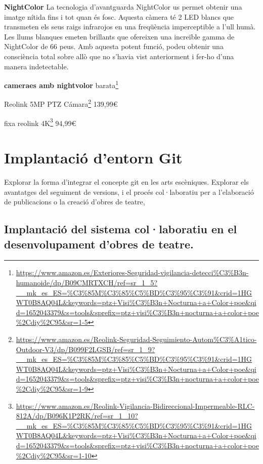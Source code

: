 \documentclass[
  10pt,
]{krantz}
\DeclareRobustCommand{\href}[2]{#2\footnote{\url{#1}}}
\begin{document}
\textbf{NightColor} La tecnologia d'avantguarda NightColor us permet obtenir una imatge nítida fins i tot quan és fosc. Aquesta càmera té 2 LED blancs que transmeten els seus raigs infrarojos en una freqüència imperceptible a l'ull humà. Les llums blanques emeten brillants que ofereixen una increïble gamma de NightColor de 66 peus. Amb aquesta potent funció, podeu obtenir una consciència total sobre allò que no s'havia vist anteriorment i fer-ho d'una manera indetectable.

\textbf{cameraes amb nightvolor} \href{https://www.amazon.es/Exteriores-Seguridad-vigilancia-detecci\%C3\%B3n-humanoide/dp/B09CMRTXCH/ref=sr_1_5?__mk_es_ES=\%C3\%85M\%C3\%85\%C5\%BD\%C3\%95\%C3\%91\&crid=1HGWT0B8AQ04L\&keywords=ptz+Visi\%C3\%B3n+Nocturna+a+Color+poe\&qid=1652043379\&s=tools\&sprefix=ptz+visi\%C3\%B3n+nocturna+a+color+poe\%2Cdiy\%2C95\&sr=1-5}{barata}

\href{https://www.amazon.es/Reolink-Seguridad-Seguimiento-Autom\%C3\%A1tico-Outdoor-V3/dp/B099F2LGSB/ref=sr_1_9?__mk_es_ES=\%C3\%85M\%C3\%85\%C5\%BD\%C3\%95\%C3\%91\&crid=1HGWT0B8AQ04L\&keywords=ptz+Visi\%C3\%B3n+Nocturna+a+Color+poe\&qid=1652043379\&s=tools\&sprefix=ptz+visi\%C3\%B3n+nocturna+a+color+poe\%2Cdiy\%2C95\&sr=1-9}{Reolink 5MP PTZ Cámara} 139,99€

\href{https://www.amazon.es/Reolink-Vigilancia-Bidireccional-Impermeable-RLC-812A/dp/B096K1P2RK/ref=sr_1_10?__mk_es_ES=\%C3\%85M\%C3\%85\%C5\%BD\%C3\%95\%C3\%91\&crid=1HGWT0B8AQ04L\&keywords=ptz+Visi\%C3\%B3n+Nocturna+a+Color+poe\&qid=1652043379\&s=tools\&sprefix=ptz+visi\%C3\%B3n+nocturna+a+color+poe\%2Cdiy\%2C95\&sr=1-10}{fixa reolink 4K} 94,99€

\hypertarget{implantaciuxf3-dentorn-git}{%
\chapter{Implantació d'entorn Git}\label{implantaciuxf3-dentorn-git}}

Explorar la forma d'integrar el concepte git en les arts escèniques. Explorar els avantatges del seguiment de versions, i el procés col·laboratiu per a l'elaboració de publicacions o la creació d'obres de teatre,

\hypertarget{implantaciuxf3-del-sistema-collaboratiu-en-el-desenvolupament-dobres-de-teatre.}{%
\section{Implantació del sistema col·laboratiu en el desenvolupament d'obres de teatre.}\label{implantaciuxf3-del-sistema-collaboratiu-en-el-desenvolupament-dobres-de-teatre.}}
\end{document}

